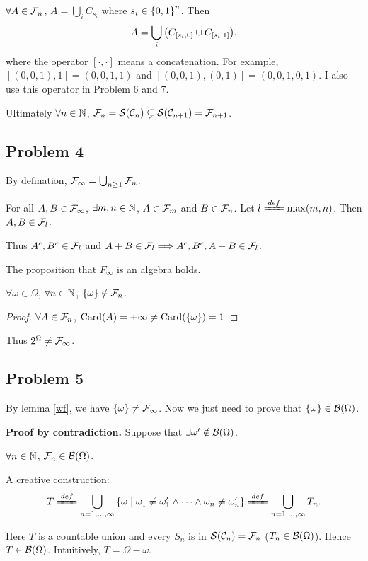 \documentclass{article}
\begin{document}
$\forall A\in\mathcal{F}_n$, $A=\bigcup_i C_{s_i}$ where $s_i\in\qty{0,1}^n$. Then
\[
	A=
	\bigcup_i \qty(C_{[s_i,0]}\cup C_{[s_i,1]})
,\]
where the operator $[\cdot,\cdot]$ means a concatenation. For example, $[(0,0,1),1]=(0,0,1,1)$ and $[(0,0,1),(0,1)]=(0,0,1,0,1)$. I also use this operator in Problem 6 and 7.

Ultimately $\forall n\in\mathbb{N}$, $\mathcal{F}_n=\mathcal{S}(\mathcal{C}_n)\subsetneq \mathcal{S}(\mathcal{C}_{n+1})=\mathcal{F}_{n+1}$.

\subsection*{\centering Problem 4}
By defination, $\mathcal{F}_\infty=\bigcup_{n\ge 1}\mathcal{F}_n$.

For all $A,B\in\mathcal{F}_\infty$, $\exists m,n\in\mathbb{N}$, $A\in\mathcal{F}_m$ and $B\in\mathcal{F}_n$. Let  $l\deq\max(m,n)$. Then  $A,B\in\mathcal{F}_l$.

Thus $A^c,B^c\in\mathcal{F}_l$ and  $A+B\in\mathcal{F}_l\Longrightarrow A^c,B^c,A+B\in\mathcal{F}_l$.

The proposition that $F_\infty$ is an algebra holds.

\begin{lemma}
	$\forall\omega\in\Omega$, $\forall n\in\mathbb{N}$, $\qty{\omega}\notin\mathcal{F}_n$.
	\label{wf}
\end{lemma}
\begin{proof}
	$\forall A\in\mathcal{F}_n$, $\mbox{Card}(A)=+\infty\ne \mbox{Card}(\qty{\omega})=1$
\end{proof}
Thus $2^{\Omega}\ne\mathcal{F}_\infty$.


\subsection*{\centering Problem 5}
By lemma \ref{wf}, we have $\qty{\omega}\ne\mathcal{F}_\infty$.
Now we just need to prove that  $\qty{\omega}\in\mathcal{B}(\Omega)$.

\textbf{Proof by contradiction.} Suppose that $\exists\omega'\notin\mathcal{B}(\Omega)$.

$\forall n\in\mathbb{N}$, $\mathcal{F}_n\in\mathcal{B}(\Omega)$.

A creative construction:
 \[
	 T\deq\bigcup_{n=1, \ldots, \infty}
	\set{\omega\mid\omega_1\ne\omega_1'\land\cdots\land\omega_n\ne\omega_n'}
	\deq\bigcup_{n=1, \ldots, \infty}T_n
.\] 

Here $T$ is a countable union and every $S_n$ is in  $\mathcal{S}(\mathcal{C}_n)=\mathcal{F}_n$ ($T_n\in\mathcal{B}(\Omega)$).
Hence $T\in\mathcal{B}(\Omega)$. Intuitively,  $T=\Omega-{\omega}$.
\end{document}

